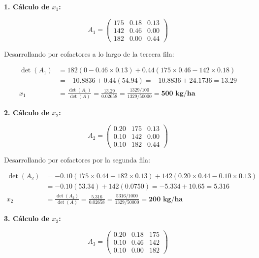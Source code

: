 \noindent\textbf{1. Cálculo de $x_1$:}

\begin{equation}
A_1 = \begin{pmatrix} 175 & 0.18 & 0.13 \\ 142 & 0.46 & 0.00 \\ 182 & 0.00 & 0.44 \end{pmatrix}
\end{equation}

Desarrollando por cofactores a lo largo de la tercera fila:

\begin{align}
\det(A_1) &= 182(0 - 0.46 \times 0.13) + 0.44(175 \times 0.46 - 142 \times 0.18) \\
&= -10.8836 + 0.44(54.94) = -10.8836 + 24.1736 = 13.29 \\[0.15cm]
x_1 &= \frac{\det(A_1)}{\det(A)} = \frac{13.29}{0.02658} = \frac{1329 / 100}{1329 / 50000} = \mathbf{500\text{ kg/ha}}
\end{align}

\noindent\textbf{2. Cálculo de $x_2$:}

\begin{equation}
A_2 = \begin{pmatrix} 0.20 & 175 & 0.13 \\ 0.10 & 142 & 0.00 \\ 0.10 & 182 & 0.44 \end{pmatrix}
\end{equation}

Desarrollando por cofactores por la segunda fila:

\begin{align}
\det(A_2) &= -0.10(175 \times 0.44 - 182 \times 0.13) + 142(0.20 \times 0.44 - 0.10 \times 0.13) \\
&= -0.10(53.34) + 142(0.0750) = -5.334 + 10.65 = 5.316 \\[0.15cm]
x_2 &= \frac{\det(A_2)}{\det(A)} = \frac{5.316}{0.02658} = \frac{5316 / 1000}{1329 / 50000} = \mathbf{200\text{ kg/ha}}
\end{align}

\noindent\textbf{3. Cálculo de $x_3$:}

\begin{equation}
A_3 = \begin{pmatrix} 0.20 & 0.18 & 175 \\ 0.10 & 0.46 & 142 \\ 0.10 & 0.00 & 182 \end{pmatrix}
\end{equation}

